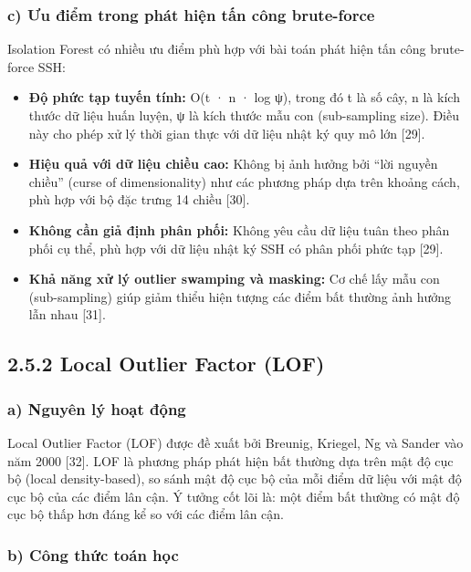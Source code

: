 \documentclass[
  a4paper]{report}
\providecommand{\tightlist}{%
  \setlength{\itemsep}{0pt}\setlength{\parskip}{0pt}}
\begin{document}
\subsubsection{c) Ưu điểm trong phát hiện tấn công
brute-force}\label{c-ux1b0u-ux111iux1ec3m-trong-phuxe1t-hiux1ec7n-tux1ea5n-cuxf4ng-brute-force}

Isolation Forest có nhiều ưu điểm phù hợp với bài toán phát hiện tấn
công brute-force SSH:

\begin{itemize}
\tightlist
\item
  \textbf{Độ phức tạp tuyến tính:} O(t · n · log ψ), trong đó t là số
  cây, n là kích thước dữ liệu huấn luyện, ψ là kích thước mẫu con
  (sub-sampling size). Điều này cho phép xử lý thời gian thực với dữ
  liệu nhật ký quy mô lớn {[}29{]}.
\item
  \textbf{Hiệu quả với dữ liệu chiều cao:} Không bị ảnh hưởng bởi ``lời
  nguyền chiều'' (curse of dimensionality) như các phương pháp dựa trên
  khoảng cách, phù hợp với bộ đặc trưng 14 chiều {[}30{]}.
\item
  \textbf{Không cần giả định phân phối:} Không yêu cầu dữ liệu tuân theo
  phân phối cụ thể, phù hợp với dữ liệu nhật ký SSH có phân phối phức
  tạp {[}29{]}.
\item
  \textbf{Khả năng xử lý outlier swamping và masking:} Cơ chế lấy mẫu
  con (sub-sampling) giúp giảm thiểu hiện tượng các điểm bất thường ảnh
  hưởng lẫn nhau {[}31{]}.
\end{itemize}

\subsection{2.5.2 Local Outlier Factor
(LOF)}\label{local-outlier-factor-lof}

\subsubsection{a) Nguyên lý hoạt
động}\label{a-nguyuxean-luxfd-houx1ea1t-ux111ux1ed9ng-1}

Local Outlier Factor (LOF) được đề xuất bởi Breunig, Kriegel, Ng và
Sander vào năm 2000 {[}32{]}. LOF là phương pháp phát hiện bất thường
dựa trên mật độ cục bộ (local density-based), so sánh mật độ cục bộ của
mỗi điểm dữ liệu với mật độ cục bộ của các điểm lân cận. Ý tưởng cốt lõi
là: một điểm bất thường có mật độ cục bộ thấp hơn đáng kể so với các
điểm lân cận.

\subsubsection{b) Công thức toán
học}\label{b-cuxf4ng-thux1ee9c-touxe1n-hux1ecdc-1}
\end{document}
